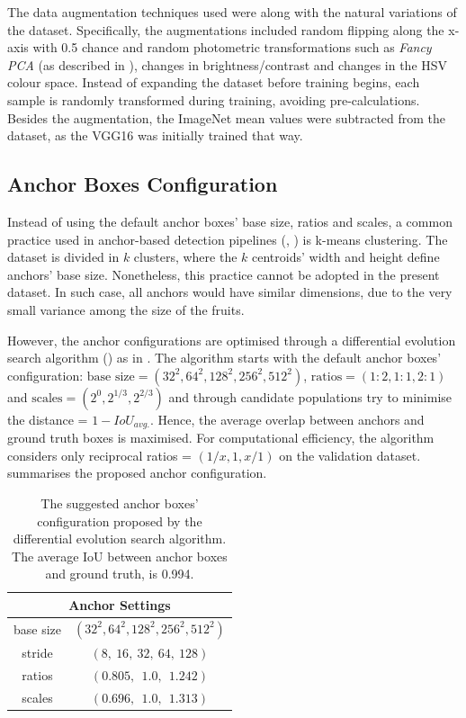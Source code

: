 The data augmentation techniques used were along with the natural variations of the dataset. Specifically, the augmentations included random flipping along the x-axis with 0.5 chance and random photometric transformations such as \textit{Fancy PCA} (as described in \cite{taylor2017improving}), changes in brightness/contrast and changes in the HSV colour space. Instead of expanding the dataset before training begins, each sample is randomly transformed during training, avoiding pre-calculations. Besides the augmentation, the ImageNet mean values were subtracted from the dataset, as the VGG16 was initially trained that way.

\subsection{Anchor Boxes Configuration}
Instead of using the default anchor boxes' base size, ratios and scales, a common practice used in anchor-based detection pipelines (\cite{redmon2017yolo9000}, \cite{redmon2018yolov3}) is k-means clustering. The dataset is divided in $k$ clusters, where the $k$ centroids' width and height define anchors' base size. Nonetheless, this practice cannot be adopted in the present dataset. In such case, all anchors would have similar dimensions, due to the very small variance among the size of the fruits.

However, the anchor configurations are optimised through a differential evolution search algorithm (\cite{storn1997differential}) as in \cite{zlocha2019improving}. The algorithm starts with the default anchor boxes' configuration: $\text{base size} = (32^2, 64^2, 128^2, 256^2, 512^2)$, $\text{ratios} = (1\!:\!2, 1\!:\!1, 2\!:\!1)$ and $\text{scales} = (2^{0}, 2^{1/3}, 2^{2/3})$ and through candidate populations try to minimise the distance = $1 - IoU_{avg.}$. Hence, the average overlap between anchors and ground truth boxes is maximised. For computational efficiency, the algorithm considers only reciprocal ratios = $(1/x, 1, x/1)$ on the validation dataset.  summarises the proposed anchor configuration. \\

\begin{table}[!htb]
  \centering
  \begin{tabular}{cc}
  \toprule
  \multicolumn{2}{c}{\textbf{Anchor Settings}} \\
  \midrule
base size	& 	\small{$(32^2, 64^2, 128^2, 256^2, 512^2)$} \\
stride 	& 	$(8, \ 16, \ 32, \ 64, \ 128)$ \\
ratios  	&	$(0.805, \ \ 1.0, \ \ 1.242)$ \\
scales  	& 	$(0.696, \ \ 1.0, \ \ 1.313)$ \\
  \bottomrule
  \end{tabular}
  \caption{The suggested anchor boxes' configuration proposed by the differential evolution search algorithm. The average IoU between anchor boxes and ground truth, is 0.994.}
  \label{tab2}
\end{table}


